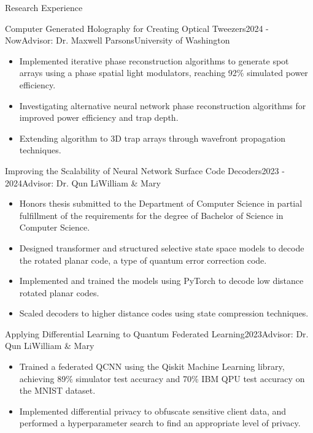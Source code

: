 \begin{rSection}{Research Experience}
\begin{rSubsection}{Computer Generated Holography for Creating Optical Tweezers}{2024 - Now}{Advisor: Dr. Maxwell Parsons}{\small University of Washington}
\begin{itemize}
\item Implemented iterative phase reconstruction algorithms to generate spot arrays using a phase spatial light modulators, reaching 92\% simulated power efficiency.
\item Investigating alternative neural network phase reconstruction algorithms for improved power efficiency and trap depth.
\item Extending algorithm to 3D trap arrays through wavefront propagation techniques.
\end{itemize}
\end{rSubsection}

\begin{rSubsection}{Improving the Scalability of Neural Network Surface Code Decoders}{2023 - 2024}{Advisor: Dr. Qun Li}{\small William \& Mary}
\begin{itemize}
\item Honors thesis submitted to the Department of Computer Science in partial fulfillment of the requirements for the degree of Bachelor of Science in Computer Science.
\item Designed transformer and structured selective state space models to decode the rotated planar code, a type of quantum error correction code.
\item Implemented and trained the models using PyTorch to decode low distance rotated planar codes.
\item Scaled decoders to higher distance codes using state compression techniques.
\end{itemize}
\end{rSubsection}

\begin{rSubsection}{Applying Differential Learning to Quantum Federated Learning}{2023}{Advisor: Dr. Qun Li}{\small William \& Mary}
\begin{itemize}
\item Trained a federated QCNN using the Qiskit Machine Learning library, achieving 89\% simulator test accuracy and 70\% IBM QPU test accuracy on the MNIST dataset.
\item Implemented differential privacy to obfuscate sensitive client data, and performed a hyperparameter search to find an appropriate level of privacy. 
\end{itemize}
\end{rSubsection}


\end{rSection}
